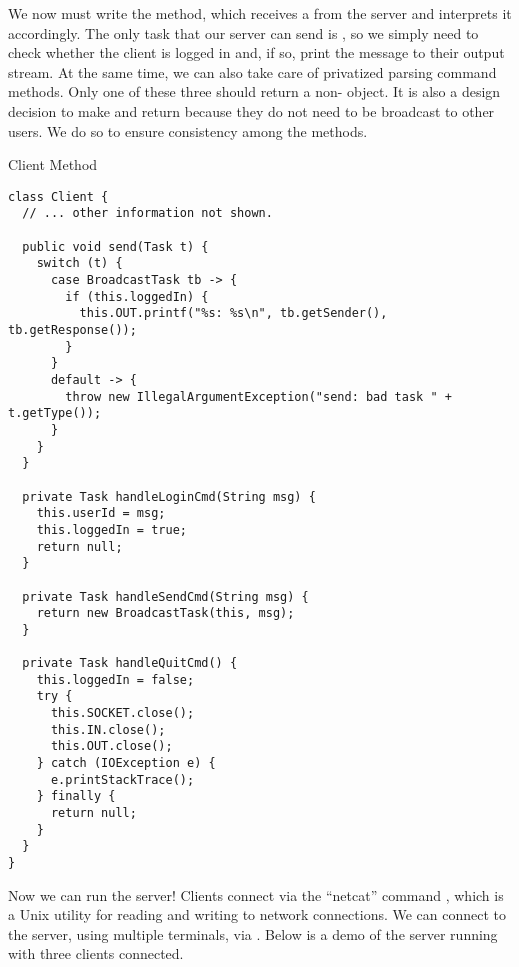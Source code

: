 We now must write the   method, which receives a  from the server and interprets it accordingly. The only task that our server can send is , so we simply need to check whether the client is logged in and, if so, print the message to their output stream. At the same time, we can also take care of privatized parsing command methods. Only one of these three should return a non- object. It is also a design decision to make  and  return  because they do not need to be broadcast to other users. We do so to ensure consistency among the methods.

\begin{cl}[]{Client  Method}
\begin{lstlisting}[language=MyJava]
class Client {
  // ... other information not shown.

  public void send(Task t) {
    switch (t) {
      case BroadcastTask tb -> {
        if (this.loggedIn) { 
          this.OUT.printf("%s: %s\n", tb.getSender(), tb.getResponse()); 
        }
      }
      default -> {
        throw new IllegalArgumentException("send: bad task " + t.getType());
      }
    }
  }

  private Task handleLoginCmd(String msg) {
    this.userId = msg;
    this.loggedIn = true;
    return null;
  }

  private Task handleSendCmd(String msg) {
    return new BroadcastTask(this, msg);
  }

  private Task handleQuitCmd() {
    this.loggedIn = false;
    try {
      this.SOCKET.close();
      this.IN.close();
      this.OUT.close();
    } catch (IOException e) { 
      e.printStackTrace(); 
    } finally {
      return null;
    }
  }
}
\end{lstlisting}
\end{cl}

Now we can run the server! Clients connect via the ``netcat'' command , which is a Unix utility for reading and writing to network connections. We can connect to the server, using multiple terminals, via . Below is a demo of the server running with three clients connected.